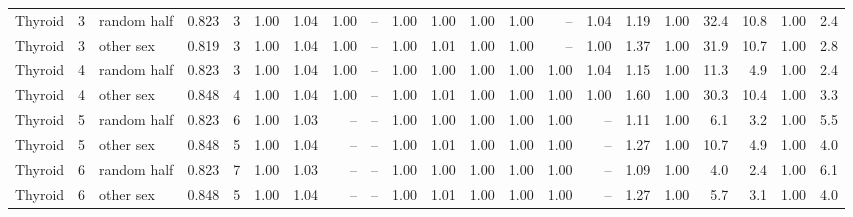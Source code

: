 \begin{table}[h]
\begin{tabular}{lllrrrrrrrrrrrrrrrrrr}
Thyroid & 3 & random half & 0.823 & 3 & 1.00 & 1.04 & 1.00 & -- & 1.00 & 1.00 & 1.00 & 1.00 & -- & 1.04 & 1.19 & 1.00 & 32.4 & 10.8 & 1.00 & 2.4 \\
Thyroid & 3 & other sex & 0.819 & 3 & 1.00 & 1.04 & 1.00 & -- & 1.00 & 1.01 & 1.00 & 1.00 & -- & 1.00 & 1.37 & 1.00 & 31.9 & 10.7 & 1.00 & 2.8 \\
Thyroid & 4 & random half & 0.823 & 3 & 1.00 & 1.04 & 1.00 & -- & 1.00 & 1.00 & 1.00 & 1.00 & 1.00 & 1.04 & 1.15 & 1.00 & 11.3 & 4.9 & 1.00 & 2.4 \\
Thyroid & 4 & other sex & 0.848 & 4 & 1.00 & 1.04 & 1.00 & -- & 1.00 & 1.01 & 1.00 & 1.00 & 1.00 & 1.00 & 1.60 & 1.00 & 30.3 & 10.4 & 1.00 & 3.3 \\
Thyroid & 5 & random half & 0.823 & 6 & 1.00 & 1.03 & -- & -- & 1.00 & 1.00 & 1.00 & 1.00 & 1.00 & -- & 1.11 & 1.00 & 6.1 & 3.2 & 1.00 & 5.5 \\
Thyroid & 5 & other sex & 0.848 & 5 & 1.00 & 1.04 & -- & -- & 1.00 & 1.01 & 1.00 & 1.00 & 1.00 & -- & 1.27 & 1.00 & 10.7 & 4.9 & 1.00 & 4.0 \\
Thyroid & 6 & random half & 0.823 & 7 & 1.00 & 1.03 & -- & -- & 1.00 & 1.00 & 1.00 & 1.00 & 1.00 & -- & 1.09 & 1.00 & 4.0 & 2.4 & 1.00 & 6.1 \\
Thyroid & 6 & other sex & 0.848 & 5 & 1.00 & 1.04 & -- & -- & 1.00 & 1.01 & 1.00 & 1.00 & 1.00 & -- & 1.27 & 1.00 & 5.7 & 3.1 & 1.00 & 4.0 \\
\bottomrule
\end{tabular}
\end{table}
